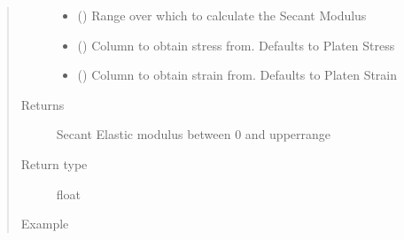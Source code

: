 \documentclass[letterpaper,10pt,english]{sphinxmanual}
\begin{document}
\begin{fulllineitems}
\begin{fulllineitems}
\begin{quote}
\begin{description}
\begin{itemize}
\item {} 
 () \textendash{} Range over which to calculate the Secant Modulus

\item {} 
 () \textendash{} Column to obtain stress from. Defaults to Platen Stress

\item {} 
 () \textendash{} Column to obtain strain from. Defaults to Platen Strain

\end{itemize}

\item[{Returns}] \leavevmode
Secant Elastic modulus between 0 and upperrange

\item[{Return type}] \leavevmode
float

\item[{Example}] \leavevmode
\begin{sphinxVerbatim}[commandchars=\\\{\}]
  
  
 
  
\end{sphinxVerbatim}

\end{description}\end{quote}

\end{fulllineitems}


\end{fulllineitems}
\end{document}
